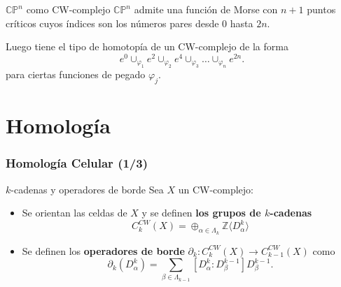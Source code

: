 \documentclass[11pt]{beamer}
\begin{document}
\begin{frame}
	\begin{exampleblock}{$\mathbb{CP}^n$ como CW-complejo}
	\medskip
	$\mathbb{CP}^n$ admite una función de Morse con $n+1$ puntos críticos cuyos índices son los números pares desde $0$ hasta $2n$.
	\medskip
	
	Luego tiene el tipo de homotopía de un CW-complejo de la forma
	\begin{equation*}
    	e^0\cup_{\varphi_1} e^2 \cup_{\varphi_2} e^4 \cup_{\varphi_3} \dots \cup_{\varphi_n} e^{2n}.
	\end{equation*}
	para ciertas funciones de pegado $\varphi_j$.
	\end{exampleblock} 
\end{frame}




\section{Homología}

\begin{frame}
\frametitle{Homología Celular (1/3)}

\begin{block}{$k$-cadenas y operadores de borde}
Sea $X$ un CW-complejo:

\medskip

\begin{itemize}[itemsep=2em]
	\item Se orientan las celdas de $X$ y se definen \textbf{los grupos de $k$-cadenas}
	\begin{equation*}
		C^{CW}_k(X) = \oplus_{\alpha\in\Lambda_k} \mathbb{Z} \langle D^k_{\alpha}\rangle
	\end{equation*}
	\item Se definen los \textbf{operadores de borde} $\partial_k : C^{CW}_k(X) \to C^{CW}_{k-1}(X)$ como
	\begin{equation*}
		\partial_k(D^k_{\alpha}) = \sum_{\beta\in\Lambda_{k-1}}[D^k_{\alpha}:D^{k-1}_{\beta}]D^{k-1}_{\beta}.
	\end{equation*}
\end{itemize}

\end{block}



\end{frame}
\end{document}
